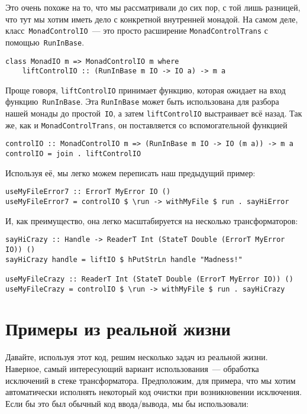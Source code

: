 Это очень похоже на то, что мы рассматривали до сих пор, с той лишь разницей,
что тут мы хотим иметь дело с конкретной внутренней монадой. На самом деле,
класс~\lstinline'MonadControlIO'~--- это просто расширение
\lstinline'MonadControlTrans' с помощью~\lstinline'RunInBase'.

\begin{lstlisting}
class MonadIO m => MonadControlIO m where
    liftControlIO :: (RunInBase m IO -> IO a) -> m a
\end{lstlisting}

Проще говоря, \lstinline'liftControlIO' принимает функцию, которая ожидает на
вход функцию~\lstinline'RunInBase'. Эта \lstinline'RunInBase' может быть
использована для разбора нашей монады до простой~\lstinline'IO', а затем
\lstinline'liftControlIO' выстраивает всё назад. Так же, как и
\lstinline'MonadControlTrans', он поставляется со вспомогательной функцией

\begin{lstlisting}
controlIO :: MonadControlIO m => (RunInBase m IO -> IO (m a)) -> m a
controlIO = join . liftControlIO
\end{lstlisting}

Используя её, мы легко можем переписать наш предыдущий пример:

\begin{lstlisting}
useMyFileError7 :: ErrorT MyError IO ()
useMyFileError7 = controlIO $ \run -> withMyFile $ run . sayHiError
\end{lstlisting}

И, как преимущество, она легко масштабируется на несколько трансформаторов:

\begin{lstlisting}
sayHiCrazy :: Handle -> ReaderT Int (StateT Double (ErrorT MyError IO)) ()
sayHiCrazy handle = liftIO $ hPutStrLn handle "Madness!"

useMyFileCrazy :: ReaderT Int (StateT Double (ErrorT MyError IO)) ()
useMyFileCrazy = controlIO $ \run -> withMyFile $ run . sayHiCrazy
\end{lstlisting}

\section{Примеры из реальной жизни}
Давайте, используя этот код, решим несколько задач из реальной жизни. Наверное,
самый интересующий вариант использования~--- обработка исключений в стеке
трансформатора. Предположим, для примера, что мы хотим автоматически исполнять
некоторый код очистки при возникновении исключения. Если бы это был обычный код
ввода/вывода, мы бы использовали:

